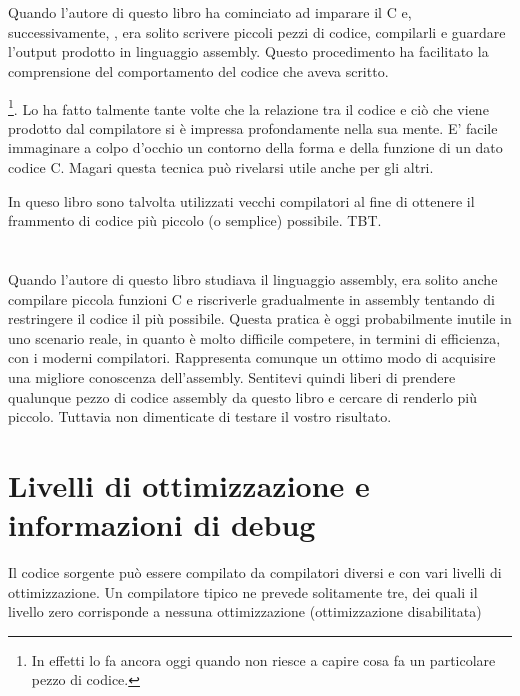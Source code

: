\section{\ITAph{}}

Quando l'autore di questo libro ha cominciato ad imparare il C e, successivamente, \Cpp, era solito scrivere piccoli pezzi di codice, compilarli e guardare l'output prodotto in linguaggio assembly. Questo procedimento ha facilitato la comprensione del comportamento del codice che aveva scritto.

\footnote{In effetti lo fa ancora oggi quando non riesce a capire cosa fa un particolare pezzo di codice.}. 
Lo ha fatto talmente tante volte che la relazione tra il codice \CCpp e ciò che viene prodotto dal compilatore si è impressa profondamente nella sua mente. E' facile immaginare a colpo d'occhio un contorno della forma e della funzione di un dato codice C. 
Magari questa tecnica può rivelarsi utile anche per gli altri.


In queso libro sono talvolta utilizzati vecchi compilatori al fine di ottenere il frammento di codice più piccolo (o semplice) possibile.
\ac{TBT}.
\section*{\Exercises}

Quando l'autore di questo libro studiava il linguaggio assembly, era solito anche compilare piccola funzioni C e riscriverle gradualmente in assembly tentando di restringere il codice il più possibile.
Questa pratica è oggi probabilmente inutile in uno scenario reale, in quanto è molto difficile competere, in termini di efficienza, con i moderni compilatori. Rappresenta comunque un ottimo modo di acquisire una migliore conoscenza dell'assembly.
Sentitevi quindi liberi di prendere qualunque pezzo di codice assembly da questo libro e cercare di renderlo più piccolo. Tuttavia non dimenticate di testare il vostro risultato.

\section*{Livelli di ottimizzazione e informazioni di debug}

Il codice sorgente può essere compilato da compilatori diversi e con vari livelli di ottimizzazione.
Un compilatore tipico ne prevede solitamente tre, dei quali il livello zero corrisponde a nessuna ottimizzazione (ottimizzazione disabilitata) 

